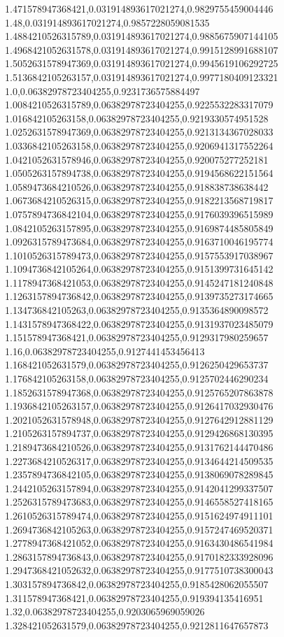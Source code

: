 1.471578947368421,0.031914893617021274,0.9829755459004446
1.48,0.031914893617021274,0.9857228059081535
1.4884210526315789,0.031914893617021274,0.9885675907144105
1.4968421052631578,0.031914893617021274,0.9915128991688107
1.5052631578947369,0.031914893617021274,0.9945619106292725
1.5136842105263157,0.031914893617021274,0.9977180409123321
1.0,0.06382978723404255,0.9231736575884497
1.0084210526315789,0.06382978723404255,0.9225532283317079
1.016842105263158,0.06382978723404255,0.9219330574951528
1.0252631578947369,0.06382978723404255,0.9213134367028033
1.0336842105263158,0.06382978723404255,0.9206941317552264
1.0421052631578946,0.06382978723404255,0.920075277252181
1.0505263157894738,0.06382978723404255,0.9194568622151564
1.0589473684210526,0.06382978723404255,0.918838738638442
1.0673684210526315,0.06382978723404255,0.9182213568719817
1.0757894736842104,0.06382978723404255,0.9176039396515989
1.0842105263157895,0.06382978723404255,0.9169874485805849
1.0926315789473684,0.06382978723404255,0.9163710046195774
1.1010526315789473,0.06382978723404255,0.9157553917038967
1.1094736842105264,0.06382978723404255,0.9151399731645142
1.1178947368421053,0.06382978723404255,0.9145247181240848
1.1263157894736842,0.06382978723404255,0.9139735273174665
1.134736842105263,0.06382978723404255,0.9135364890098572
1.1431578947368422,0.06382978723404255,0.9131937023485079
1.151578947368421,0.06382978723404255,0.9129317980259657
1.16,0.06382978723404255,0.9127441453456413
1.168421052631579,0.06382978723404255,0.9126250429653737
1.176842105263158,0.06382978723404255,0.9125702446290234
1.1852631578947368,0.06382978723404255,0.9125765207863878
1.1936842105263157,0.06382978723404255,0.9126417032930476
1.2021052631578948,0.06382978723404255,0.9127642912881129
1.2105263157894737,0.06382978723404255,0.9129426868130395
1.2189473684210526,0.06382978723404255,0.9131762144470486
1.2273684210526317,0.06382978723404255,0.9134644214509535
1.2357894736842105,0.06382978723404255,0.9138069078289845
1.2442105263157894,0.06382978723404255,0.9142041299337507
1.2526315789473683,0.06382978723404255,0.9146558527418165
1.2610526315789474,0.06382978723404255,0.9151624974911101
1.2694736842105263,0.06382978723404255,0.9157247469520371
1.2778947368421052,0.06382978723404255,0.9163430486541984
1.2863157894736843,0.06382978723404255,0.9170182333928096
1.2947368421052632,0.06382978723404255,0.9177510738300043
1.303157894736842,0.06382978723404255,0.9185428062055507
1.311578947368421,0.06382978723404255,0.919394135416951
1.32,0.06382978723404255,0.9203065969059026
1.328421052631579,0.06382978723404255,0.9212811647657873
